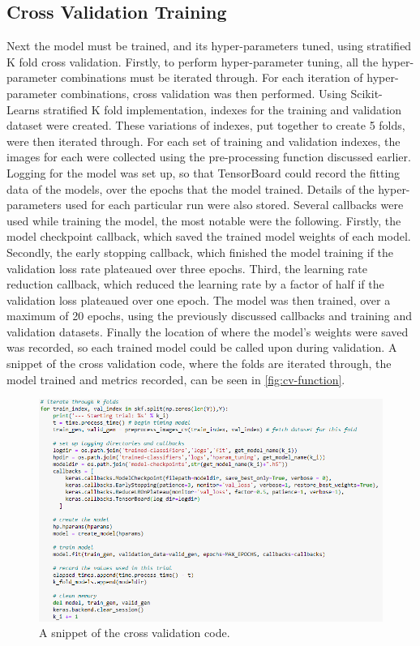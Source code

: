 \subsection{Cross Validation Training}
Next the model must be trained, and its hyper-parameters tuned, using stratified K fold cross validation. Firstly, to perform hyper-parameter tuning, all the hyper-parameter combinations must be iterated through. For each iteration of hyper-parameter combinations, cross validation was then performed. Using Scikit-Learns stratified K fold implementation, indexes for the training and validation dataset were created. These variations of indexes, put together to create 5 folds, were then iterated through. For each set of training and validation indexes, the images for each were collected using the pre-processing function discussed earlier. Logging for the model was set up, so that TensorBoard could record the fitting data of the models, over the epochs that the model trained. Details of the hyper-parameters used for each particular run were also stored. Several callbacks were used while training the model, the most notable were the following. Firstly, the model checkpoint callback, which saved the trained model weights of each model. Secondly, the early stopping callback, which finished the model training if the validation loss rate plateaued over three epochs. Third, the learning rate reduction callback, which reduced the learning rate by a factor of half if the validation loss plateaued over one epoch. The model was then trained, over a maximum of 20 epochs, using the previously discussed callbacks and training and validation datasets. Finally the location of where the model's weights were saved was recorded, so each trained model could be called upon during validation. A snippet of the cross validation code, where the folds are iterated through, the model trained and metrics recorded, can be seen in \autoref{fig:cv-function}.

\begin{figure}[H]
    \centering
    \includegraphics[width=\textwidth]{figures/cv-code.png}
    \caption{A snippet of the cross validation code.}
    \label{fig:cv-function}
\end{figure}

